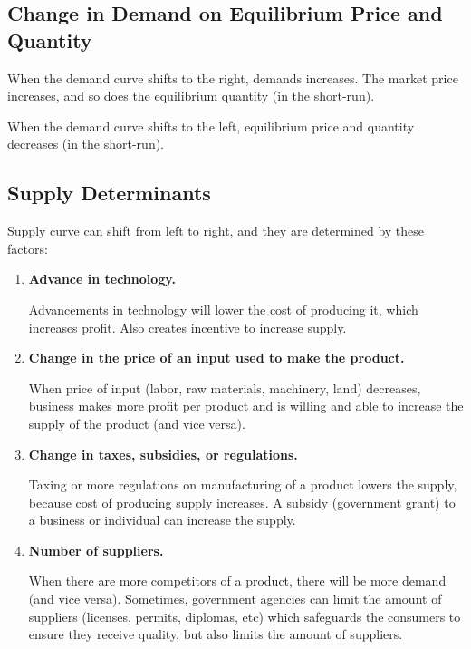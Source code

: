 \documentclass[a4paper, 12pt] {article}
\begin{document}
\subsection{Change in Demand on Equilibrium Price and\\ Quantity}
When the demand curve shifts to the right, demands increases. The market price
increases, and so does the equilibrium quantity (in the short-run).

When the demand curve shifts to the left, equilibrium price and quantity decreases
(in the short-run).

\subsection{Supply Determinants}
Supply curve can shift from left to right, and they are determined by these
factors:

\begin{enumerate}
    \item \textbf{Advance in technology.}

        Advancements in technology will lower the cost of producing it, which
        increases profit. Also creates incentive to increase supply.

    \item \textbf{Change in the price of an input used to make the product.}
        
        When price of input (labor, raw materials, machinery, land) decreases,
        business makes more profit per product and is willing and able to
        increase the supply of the product (and vice versa).

    \item \textbf{Change in taxes, subsidies, or regulations.}

        Taxing or more regulations on manufacturing of a product lowers the 
        supply, because cost of producing supply increases. A subsidy (government
        grant) to a business or individual can increase the supply.

    \item \textbf{Number of suppliers.}

        When there are more competitors of a product, there will be more demand
        (and vice versa). Sometimes, government agencies can limit the amount of
        suppliers (licenses, permits, diplomas, etc) which safeguards the consumers
        to ensure they receive quality, but also limits the amount of suppliers.
\end{enumerate}
\end{document}
